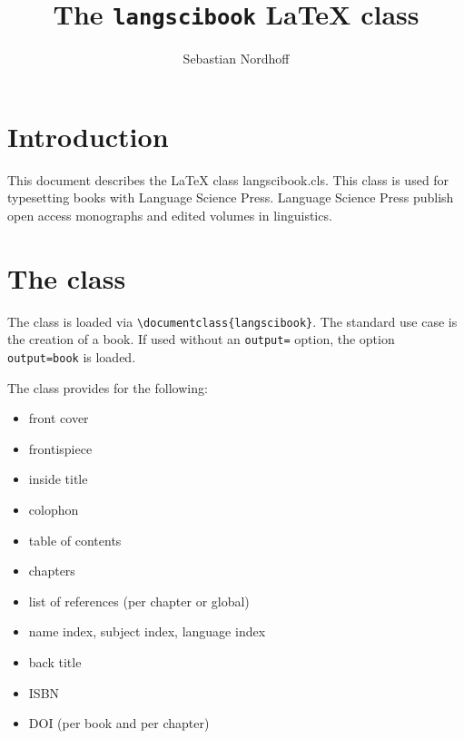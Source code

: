 \documentclass[%
output=guidelines,guidelines]{langscibook}
\author{Sebastian Nordhoff}
\title{The \texttt{langscibook} {\LaTeX} class}
\subtitle{}
\begin{document}
\maketitle

\frontmatter
{} %
\tableofcontents
% 
% 
% 

\mainmatter
\chapter{Introduction}
This document describes the {\LaTeX} class langscibook.cls. This class is used for typesetting books with Language Science Press. Language Science Press publish open access monographs and edited volumes in linguistics.


\chapter{The class}
The class is loaded via \verb+\documentclass{langscibook}+. The standard use case is the creation of a book. If used without an \texttt{output=} option, the option \texttt{output=book} is loaded.

The class provides for the following:
\begin{itemize}
 \item front cover
 \item frontispiece
 \item inside title
 \item colophon
 \item table of contents
 \item chapters
 \item list of references (per chapter or global)
 \item name index, subject index, language index
 \item back title
 \item ISBN
 \item DOI (per book and per chapter)
\end{itemize}

\end{document}
